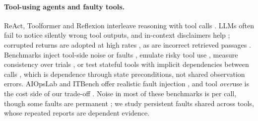 \paragraph{Tool-using agents and faulty tools.}
ReAct, Toolformer and Reflexion interleave reasoning with tool calls \citep{yao2023react,schick2023toolformer,shinn2023reflexion}.
LLMs often fail to notice silently wrong tool outputs, and in-context disclaimers help \citep{sun2024tools}; corrupted returns are adopted at high rates \citep{yang2026overreliance}, as are incorrect retrieved passages \citep{wu2024clasheval}.
Benchmarks inject tool-side noise or faults \citep{wang2026agentnoisebench,zhu2026toolmaze}, emulate risky tool use \citep{ruan2024identifying}, measure consistency over trials \citep{yao2025taubench}, or test stateful tools with implicit dependencies between calls \citep{lu2025toolsandbox}, which is dependence through state preconditions, not shared observation errors.
AIOpsLab and ITBench offer realistic fault injection \citep{chen2025aiopslab,jha2025itbench}, and tool \emph{over}use is the cost side of our trade-off \citep{qian2025smart}.
Noise in most of these benchmarks is per call, though some faults are permanent \citep{zhu2026toolmaze}; we study persistent faults shared across tools, whose repeated reports are dependent evidence.

